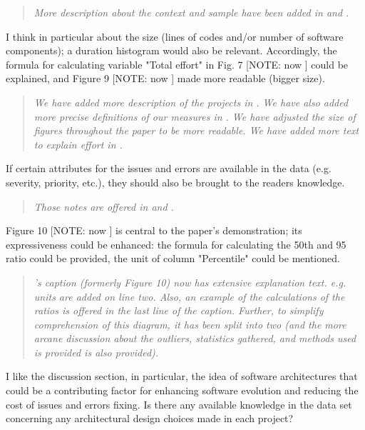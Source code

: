 \begin{quote}{\em 
More description about the context and sample have been added in  and .}\end{quote}

I think in particular about the size (lines of codes and/or
 number of software components); a duration histogram would
 also be relevant. Accordingly, the formula for calculating
 variable "Total effort" in Fig. 7 [NOTE: now ] could be explained, and
 Figure 9 [NOTE: now ] made more readable (bigger size).
 
 \begin{quote}{\em We have added more description of the projects in . We have also added more precise definitions of our measures in . We have adjusted the size of figures throughout the paper to be more readable. We have added more text 
 to explain {\em effort} in .}\end{quote}

 
If certain attributes for the issues and errors are
available in the data (e.g. severity, priority, etc.), they
should also be brought to the readers knowledge.  
 

\begin{quote}{\em 
Those notes are offered in  and .}\end{quote}

Figure 10 [NOTE: now ] is central to the paper's demonstration; its
expressiveness could be enhanced: the formula for calculating the 50th
and 95 ratio could be provided,  the unit of column
"Percentile" could be mentioned. 

\begin{quote}{\em
{}'s caption (formerly Figure 10) now has extensive explanation text. e.g. units
are added on line two. Also, an example of the calculations of the ratios is offered
in the last line of the caption. Further,
to simplify comprehension of this diagram, it has been split into two
(and the more arcane discussion about the outliers, statistics gathered, and methods used is provided is also provided).}\end{quote}

I like the discussion section, in particular, the idea
of software architectures that could be a contributing
factor for enhancing software evolution and reducing the
cost of issues and errors fixing. Is there any available
knowledge in the data set concerning any architectural
design choices made in each project?  


